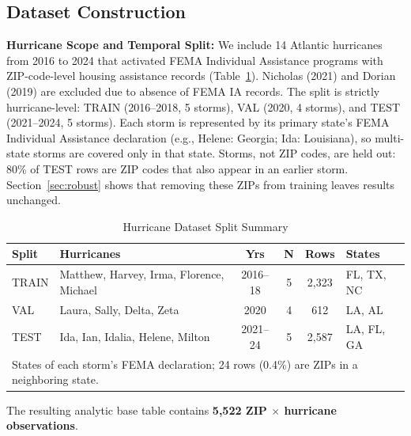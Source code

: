 \documentclass[conference]{IEEEtran}
\renewcommand{\_}{\origunderscore\allowbreak}
\begin{document}
\subsection{Dataset Construction}

\textbf{Hurricane Scope and Temporal Split:}
We include 14 Atlantic hurricanes from 2016 to 2024 that
activated FEMA Individual Assistance programs with
ZIP-code-level housing assistance records (Table~\ref{tab:hurricanes}).
Nicholas (2021) and Dorian (2019) are excluded due to absence
of FEMA IA records. The split is strictly hurricane-level:
TRAIN (2016--2018, 5 storms), VAL (2020, 4 storms), and TEST
(2021--2024, 5 storms). Each storm is represented by its primary
state's FEMA Individual Assistance declaration (e.g., Helene:
Georgia; Ida: Louisiana), so multi-state storms are covered only
in that state. Storms, not ZIP codes, are held out:
80\% of TEST rows are ZIP codes that also appear in an earlier
storm. Section~\ref{sec:robust} shows
that removing these ZIPs from training leaves results unchanged.

\begin{table}[htbp]
\caption{Hurricane Dataset Split Summary}
\label{tab:hurricanes}
\centering
\small
\setlength{\tabcolsep}{3pt}
\begin{tabular}{l>{\raggedright\arraybackslash}p{2.3cm}ccc>{\raggedright\arraybackslash}p{1.2cm}}
\toprule
\textbf{Split} & \textbf{Hurricanes} & \textbf{Yrs} & \textbf{N} &
\textbf{Rows} & \textbf{States} \\
\midrule
TRAIN & Matthew, Harvey, Irma, Florence, Michael & 2016--18 & 5 &
2,323 & FL, TX, NC \\
\midrule
VAL   & Laura, Sally, Delta, Zeta & 2020 & 4 & 612 &
LA, AL \\
\midrule
TEST  & Ida, Ian, Idalia, Helene, Milton & 2021--24 & 5 & 2,587 &
LA, FL, GA \\
\bottomrule
\multicolumn{6}{p{0.94\columnwidth}}{\footnotesize States of each
storm's FEMA declaration; 24 rows (0.4\%) are ZIPs in a neighboring
state.}\\
\end{tabular}
\end{table}

The resulting analytic base table contains \textbf{5,522 ZIP $\times$
hurricane observations}.
\end{document}
